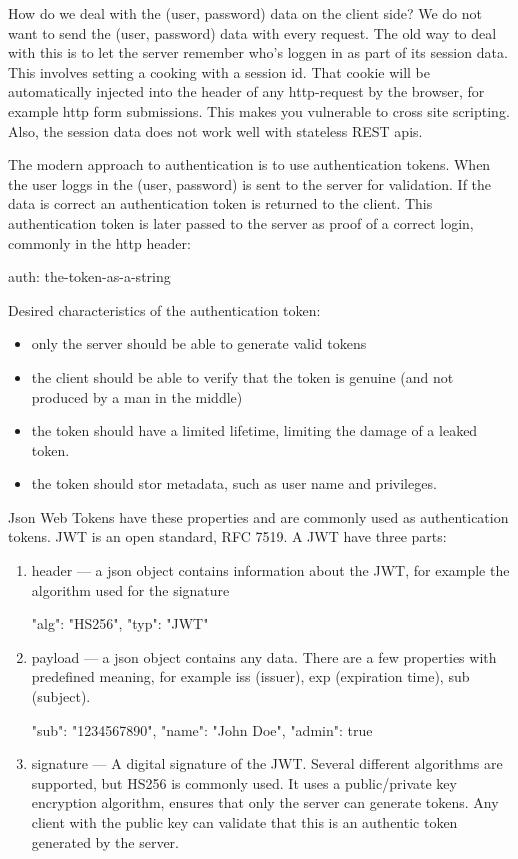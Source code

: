 How do we deal with the (user, password) data on the client side? We do not want to send the (user, password) data with every request. The old way to deal with this is to let the server remember who's loggen in as part of its session data. This involves setting a cooking with a session id. That cookie will be automatically injected into the header of any http-request by the browser, for example http form submissions. This makes you vulnerable to cross site scripting. Also, the session data does not work well with stateless REST apis. 

The modern approach to authentication is to use authentication tokens. When the user loggs in the (user, password) is sent to the server for validation. If the data is correct an authentication token is returned to the client. This authentication token is later passed to the server as proof of a correct login, commonly in the http header:
\begin{Code}
auth: the-token-as-a-string
\end{Code}
Desired characteristics of the authentication token:
\begin{itemize}
\item only the server should be able to generate valid tokens
\item the client should be able to verify that the token is genuine (and not produced by a man in the middle)
\item the token should have a limited lifetime, limiting the damage of a leaked token.
\item the token should stor metadata, such as user name and privileges.
\end{itemize}
Json Web Tokens have these properties and are commonly used as authentication tokens. JWT is an open standard, RFC 7519. A JWT have three parts:
\begin{enumerate}
\item header --- a json object contains information about the JWT, for example the algorithm used for the signature
\begin{Code}
{
  "alg": "HS256",
  "typ": "JWT"
}
\end{Code}
\item payload --- a json object contains any data. There are a few properties with predefined meaning, for example iss (issuer), exp (expiration time), sub (subject).
\begin{Code}
{
  "sub": "1234567890",
  "name": "John Doe",
  "admin": true
}
\end{Code}
\item signature --- A digital signature of the JWT. Several different algorithms are supported, but HS256 is commonly used. It uses a public/private key encryption algorithm, ensures that only the server can generate tokens. Any client with the public key can validate that this is an authentic token generated by the server.
\end{enumerate}
